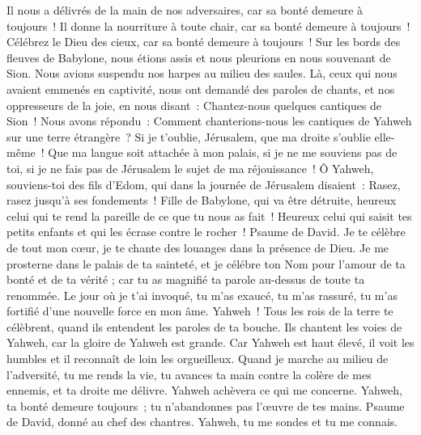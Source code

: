 \begin{multicols}{2}
Il nous a délivrés de la main de nos adversaires, car sa bonté demeure à toujours~!
Il donne la nourriture à toute chair, car sa bonté demeure à toujours~!
Célébrez le Dieu des cieux, car sa bonté demeure à toujours~!
\VerseOne{}Sur les bords des fleuves de Babylone, nous étions assis et nous pleurions en nous souvenant de Sion.
Nous avions suspendu nos harpes au milieu des saules.
Là, ceux qui nous avaient emmenés en captivité, nous ont demandé des paroles de chants, et nos oppresseurs de la joie, en nous disant~: Chantez-nous quelques cantiques de Sion~! Nous avons répondu~:
Comment chanterions-nous les cantiques de Yahweh sur une terre étrangère~?
Si je t'oublie, Jérusalem, que ma droite s'oublie elle-même~!
Que ma langue soit attachée à mon palais, si je ne me souviens pas de toi, si je ne fais pas de Jérusalem le sujet de ma réjouissance~!
Ô Yahweh, souviens-toi des fils d'Edom, qui dans la journée de Jérusalem disaient~: Rasez, rasez jusqu'à ses fondements~!
Fille de Babylone, qui va être détruite, heureux celui qui te rend la pareille de ce que tu nous as fait~!
Heureux celui qui saisit tes petits enfants et qui les écrase contre le rocher~!
\VerseOne{}Psaume de David. Je te célèbre de tout mon cœur, je te chante des louanges dans la présence de Dieu.
Je me prosterne dans le palais de ta sainteté, et je célébre ton Nom pour l'amour de ta bonté et de ta vérité ; car tu as magnifié ta parole au-dessus de toute ta renommée.
Le jour où je t'ai invoqué, tu m'as exaucé, tu m'as rassuré, tu m'as fortifié d'une nouvelle force en mon âme.
Yahweh~! Tous les rois de la terre te célèbrent, quand ils entendent les paroles de ta bouche.
Ils chantent les voies de Yahweh, car la gloire de Yahweh est grande.
Car Yahweh est haut élevé, il voit les humbles et il reconnaît de loin les orgueilleux.
Quand je marche au milieu de l'adversité, tu me rends la vie, tu avances ta main contre la colère de mes ennemis, et ta droite me délivre.
Yahweh achèvera ce qui me concerne. Yahweh, ta bonté demeure toujours~; tu n'abandonnes pas l'œuvre de tes mains.
\VerseOne{}Psaume de David, donné au chef des chantres. Yahweh, tu me sondes et tu me connais.

\end{multicols}

